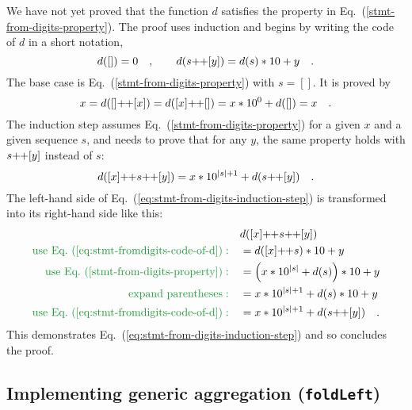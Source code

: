 We have not yet proved that the function $d$ satisfies the property
in Eq.~(\ref{stmt-from-digits-property}). The proof uses induction
and begins by writing the code of $d$ in a short notation,
\begin{equation}
d(\left[\right])=0\quad,\quad\quad d(s\negmedspace+\negthickspace+[y])=d(s)*10+y\quad.\label{eq:stmt-fromdigits-code-of-d}
\end{equation}
The base case is Eq.~(\ref{stmt-from-digits-property}) with $s=[]$.
It is proved by
\[
x=d([]\negmedspace+\negthickspace+[x])=d([x]\negmedspace+\negthickspace+[])=x*10^{0}+d(\left[\right])=x\quad.
\]
The induction step assumes Eq.~(\ref{stmt-from-digits-property})
for a given $x$ and a given sequence $s$, and needs to prove that
for any $y$, the same property holds with $s\negmedspace+\negthickspace+[y]$
instead of $s$:
\begin{equation}
d([x]\negmedspace+\negthickspace+s\negmedspace+\negthickspace+[y])=x*10^{\left|s\right|+1}+d(s\negmedspace+\negthickspace+[y])\quad.\label{eq:stmt-from-digits-induction-step}
\end{equation}
The left-hand side of Eq.~(\ref{eq:stmt-from-digits-induction-step})
is transformed into its right-hand side like this:
\begin{align*}
 & d([x]\negmedspace+\negthickspace+s\negmedspace+\negthickspace+[y])\\
{\color{greenunder}\text{use Eq.~(\ref{eq:stmt-fromdigits-code-of-d})}:}\quad & =d([x]\negmedspace+\negthickspace+s)*10+y\\
{\color{greenunder}\text{use Eq.~(\ref{stmt-from-digits-property})}:}\quad & =\left(x*10^{\left|s\right|}+d(s)\right)*10+y\\
{\color{greenunder}\text{expand parentheses}:}\quad & =x*10^{\left|s\right|+1}+d(s)*10+y\\
{\color{greenunder}\text{use Eq.~(\ref{eq:stmt-fromdigits-code-of-d})}:}\quad & =x*10^{\left|s\right|+1}+d(s\negmedspace+\negthickspace+[y])\quad.
\end{align*}
This demonstrates Eq.~(\ref{eq:stmt-from-digits-induction-step})
and so concludes the proof.

\subsection{Implementing generic aggregation (\texttt{foldLeft})\label{subsec:implementing-generic-aggregation-foldleft}}

